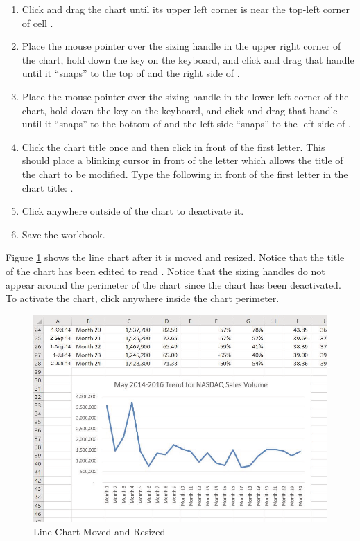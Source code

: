 \begin{enumbox}
	\begin{enumerate}
		\item Click and drag the chart until its upper left corner is near the top-left corner of cell .
		\item Place the mouse pointer over the sizing handle in the upper right corner of the chart, hold down the  key on the keyboard, and click and drag that handle until it ``snaps'' to the top of  and the right side of .
		\item Place the mouse pointer over the sizing handle in the lower left corner of the chart, hold down the  key on the keyboard, and click and drag that handle until it ``snaps'' to the bottom of  and the left side ``snaps'' to the left side of .
		\item Click the chart title once and then click in front of the first letter. This should place a blinking cursor in front of the letter which allows the title of the chart to be modified. Type the following in front of the first letter in the chart title: .
		\item Click anywhere outside of the chart to deactivate it.
		\item Save the  workbook.
	\end{enumerate}
\end{enumbox}
	
Figure \ref{04:fig04} shows the line chart after it is moved and resized. Notice that the title of the chart has been edited to read . Notice that the sizing handles do not appear around the perimeter of the chart since the chart has been deactivated. To activate the chart, click anywhere inside the chart perimeter.

\begin{figure}[H]
	\centering
	\includegraphics[width=\maxwidth{.95\linewidth}]{gfx/ch04_fig04}
	\caption{Line Chart Moved and Resized}
	\label{04:fig04}
\end{figure}

